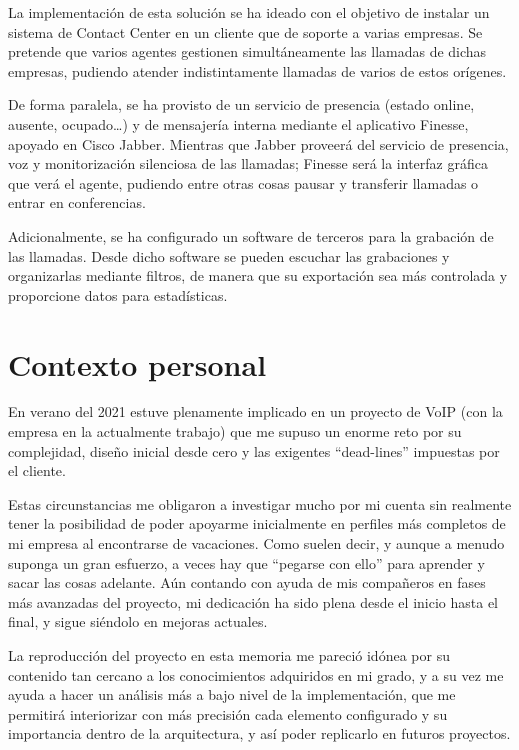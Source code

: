 \documentclass[a4paper, 12pt]{book}
\begin{document}
La implementación de esta solución se ha ideado con el objetivo de instalar un sistema de Contact Center en un cliente que de soporte a varias empresas.
Se pretende que varios agentes gestionen simultáneamente las llamadas de dichas empresas, pudiendo atender indistintamente llamadas de varios de estos orígenes.

De forma paralela, se ha provisto de un servicio de presencia (estado online, ausente, ocupado\ldots) y de mensajería interna mediante el aplicativo Finesse, apoyado en Cisco Jabber.
Mientras que Jabber proveerá del servicio de presencia, voz y monitorización silenciosa de las llamadas; Finesse será la interfaz gráfica que verá el agente, pudiendo entre otras cosas pausar y transferir llamadas o entrar en conferencias.

Adicionalmente, se ha configurado un software de terceros para la grabación de las llamadas. Desde dicho software se pueden escuchar las grabaciones y organizarlas mediante filtros, de manera que su exportación sea más controlada y proporcione datos para estadísticas.



\section{Contexto personal}
En verano del 2021 estuve plenamente implicado en un proyecto de VoIP (con la empresa en la actualmente trabajo) que me supuso un enorme reto por su complejidad, diseño inicial desde cero y las exigentes ``dead-lines'' impuestas por el cliente.

Estas circunstancias me obligaron a investigar mucho por mi cuenta sin realmente tener la posibilidad de poder apoyarme inicialmente en perfiles más completos de mi empresa al encontrarse de vacaciones.
Como suelen decir, y aunque a menudo suponga un gran esfuerzo, a veces hay que ``pegarse con ello'' para aprender y sacar las cosas adelante.
Aún contando con ayuda de mis compañeros en fases más avanzadas del proyecto, mi dedicación ha sido plena desde el inicio hasta el final, y sigue siéndolo en mejoras actuales.

La reproducción del proyecto en esta memoria me pareció idónea por su contenido tan cercano a los conocimientos adquiridos en mi grado, y a su vez me ayuda a hacer un análisis más a bajo nivel de la implementación, que me permitirá interiorizar con más precisión cada elemento configurado y su importancia dentro de la arquitectura, y así poder replicarlo en futuros proyectos.
\end{document}
